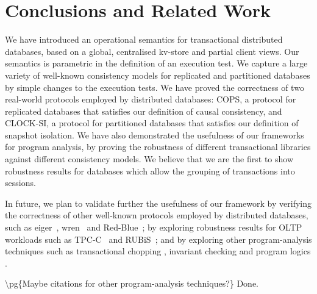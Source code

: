 \section{Conclusions and Related Work}
\label{sec:conclusions}
We have introduced  an  operational semantics for 
transactional distributed databases, based on a global, centralised 
kv-store and partial client views. 
Our semantics is parametric in the definition of an execution test.
We capture a large variety of well-known consistency models 
for replicated and partitioned databases by simple changes to  the execution tests. 
We have proved the correctness of two real-world protocols employed by distributed 
databases: COPS, a 
protocol for replicated databases that satisfies our definition of causal consistency, 
and CLOCK-SI, a protocol for partitioned databases that satisfies our
definition of 
snapshot isolation. We have also demonstrated the usefulness of our frameworks 
for program analysis, by proving the robustness of different transactional 
libraries against different consistency models. We believe that we are
the first to show robustness results for  databases which  allow
the grouping of  transactions into sessions. 

In future, we plan to validate further the usefulness of our framework
by verifying the correctness of other well-known protocols employed by
distributed databases, such as eiger~\cite{eiger}, wren~\cite{wren} and
Red-Blue~\cite{redblue}; by exploring robustness results for OLTP
workloads  such as TPC-C~\cite{tpcc} and RUBiS~\cite{rubis};
and by exploring other program-analysis techniques such as
transactional chopping \cite{chopping,psi-chopping}, invariant checking 
\cite{cise,repliss} and program logics \cite{alonetogether}. 

\ac{
\pg{Maybe citations for other program-analysis techniques?}
Done.
}

